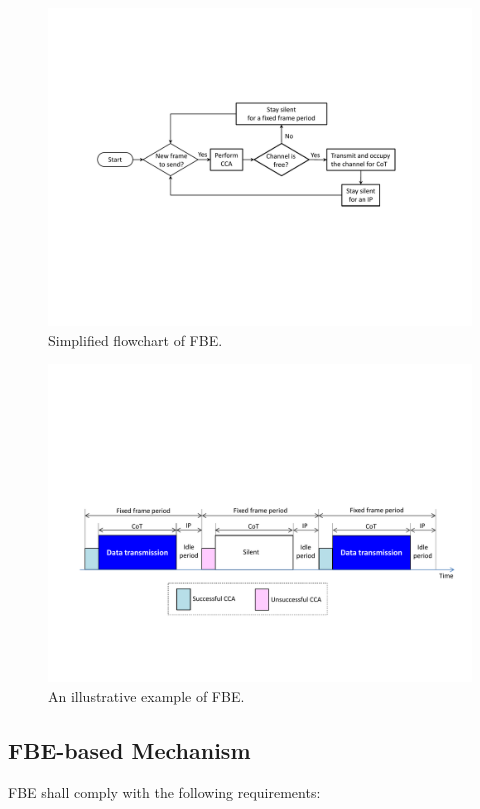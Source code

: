 \begin{figure}[!t]
	\centering
	\includegraphics[width=0.9\columnwidth]{figures2/FBE-flowchart}
	\caption{Simplified flowchart of FBE.}
	\label{figs:FBE-flowchart}
\end{figure}

\begin{figure}[!t]
	\centering
	\includegraphics[width=0.9\columnwidth]{figures2/FBE-example}
	\caption{An illustrative example of FBE.}
	\label{figs:FBE-example}
\end{figure}

\subsection{FBE-based Mechanism}
\label{etsi-lbt:fbe}
FBE shall comply with the following requirements:

